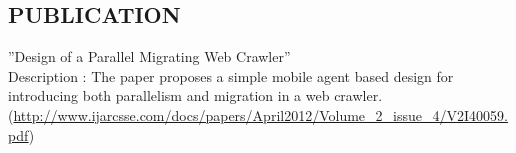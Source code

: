 \documentclass[margin]{res}
\begin{document}
\begin{resume}
\section{PUBLICATION}  ''Design of a Parallel Migrating Web Crawler'' \\
					   Description : The paper proposes a simple mobile agent based design for introducing both parallelism and migration in a web crawler.
					   (\url{http://www.ijarcsse.com/docs/papers/April2012/Volume_2_issue_4/V2I40059.pdf})

\end{resume}
\end{document}
